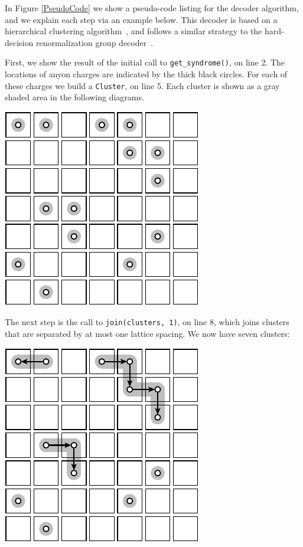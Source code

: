 In Figure \ref{PseudoCode} we show a pseudo-code listing for the
decoder algorithm,
and we explain each step via an example below.
This decoder is based on
a hierarchical clustering algorithm~\cite{Hastie2009, Wootton2015b},
and follows a similar strategy to
the hard-decision renormalization group decoder~\cite{Bravyi2011}.

\begin{samepage}
First, we show the result of the initial call to {\tt get\_syndrome()}, on line 2.
The locations of anyon charges are indicated by the thick black circles.
For each of these charges we build a {\tt Cluster}, on line 5.
Each cluster is shown as a gray shaded area in the following diagrams.
\begin{center}
\includegraphics[]{pic-decode-0.pdf}
\end{center}
\end{samepage}

\begin{samepage}
The next step is the call to {\tt join(clusters, 1)}, on line 8,
which joins clusters that are separated by at most one lattice
spacing. We now have seven clusters:
\begin{center}
\includegraphics[]{pic-decode-1.pdf}
\end{center}
\end{samepage}

